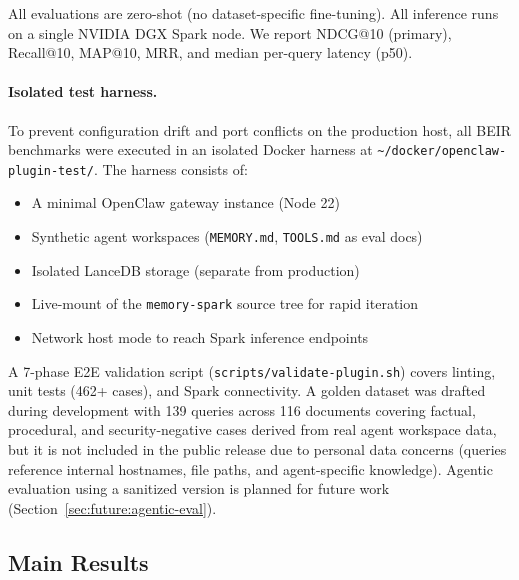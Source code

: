 \documentclass[11pt]{article}
\begin{document}
All evaluations are zero-shot (no dataset-specific fine-tuning). All inference runs on
a single NVIDIA DGX Spark node. We report NDCG@10 (primary), Recall@10, MAP@10, MRR,
and median per-query latency (p50).

\paragraph{Isolated test harness.}
To prevent configuration drift and port conflicts on the production host,
all BEIR benchmarks were executed in an isolated Docker harness at
\texttt{\textasciitilde/docker/openclaw-plugin-test/}. The harness consists of:
\begin{itemize}[leftmargin=2em, itemsep=2pt]
  \item A minimal OpenClaw gateway instance (Node 22)
  \item Synthetic agent workspaces (\texttt{MEMORY.md}, \texttt{TOOLS.md} as eval docs)
  \item Isolated LanceDB storage (separate from production)
  \item Live-mount of the \texttt{memory-spark} source tree for rapid iteration
  \item Network host mode to reach Spark inference endpoints
\end{itemize}
A 7-phase E2E validation script (\texttt{scripts/validate-plugin.sh}) covers linting,
unit tests (462+ cases), and Spark connectivity. A golden dataset was drafted during
development with 139 queries across 116 documents covering factual, procedural, and
security-negative cases derived from real agent workspace data, but it is not included
in the public release due to personal data concerns (queries reference internal
hostnames, file paths, and agent-specific knowledge). Agentic evaluation using a
sanitized version is planned for future work (Section~\ref{sec:future:agentic-eval}).

\subsection{Main Results}
\label{sec:eval:main}
\end{document}

